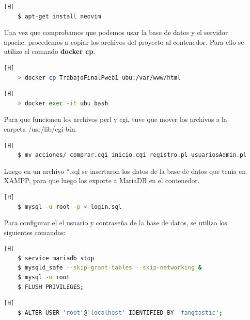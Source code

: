 \begin{lstlisting}[language=bash,caption={Instalamos neovim para la edicion de archivos}][H]
    $ apt-get install neovim
\end{lstlisting}

Una vez que comprobamos que podemos usar la base de datos y el servidor apache, procedemos a copiar los archivos del proyecto al contenedor. Para ello se utilizo el comando \textbf{docker cp}.

\begin{lstlisting}[language=bash,caption={Copiando los archivos al contenedor}][H]
    > docker cp TrabajoFinalPweb1 ubu:/var/www/html
\end{lstlisting}

\begin{lstlisting}[language=bash,caption={Ingresamos al contenedor}][H]
    > docker exec -it ubu bash
\end{lstlisting}

Para que funcionen los archivos perl y cgi, tuve que mover los archivos a la carpeta /usr/lib/cgi-bin.

\begin{lstlisting}[language=bash,caption={Moviendo los archivos}][H]
    $ mv acciones/ comprar.cgi inicio.cgi registro.pl usuariosAdmin.pl catalogoAdmin.pl ingresarArticulos.html redireccionar.pl registroAdmin.pl /usr/lib/cgi-bin/
\end{lstlisting}

Luego en un archivo *.sql se insertaron los datos de la base de datos que tenia en XAMPP, para que luego los exporte a MariaDB en el contenedor.

\begin{lstlisting}[language=bash,caption={Exportando la base de datos}][H]
    $ mysql -u root -p < login.sql
\end{lstlisting}

Para configurar el el usuario y contraseña de la base de datos, se utilizo los siguientes comandos:

\begin{lstlisting}[language=bash,caption={Abriendo la configuración para establecer el usuario y contraseña}][H]
    $ service mariadb stop
    $ mysqld_safe --skip-grant-tables --skip-networking &
    $ mysql -u root
    $ FLUSH PRIVILEGES;
\end{lstlisting}

\begin{lstlisting}[language=bash,caption={Estableciendo el usuario y contraseña}][H]
    $ ALTER USER 'root'@'localhost' IDENTIFIED BY 'fangtastic';
\end{lstlisting}

